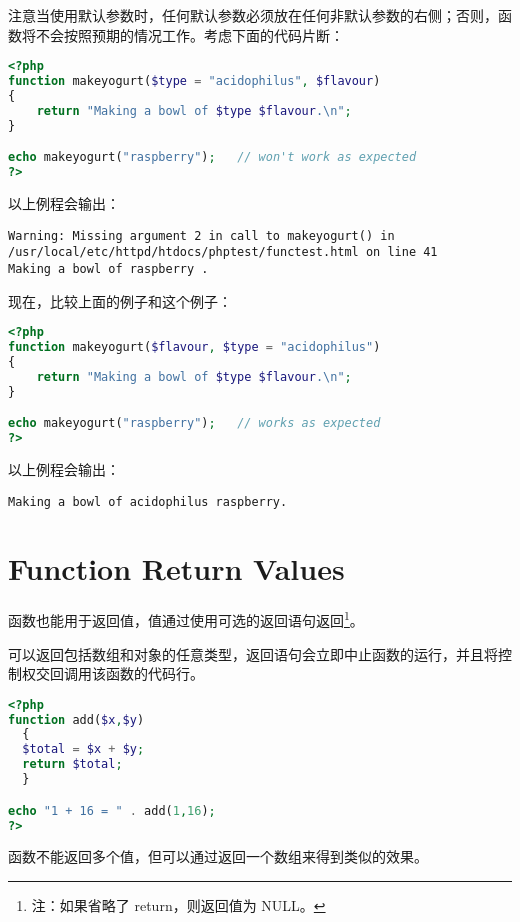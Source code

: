 注意当使用默认参数时，任何默认参数必须放在任何非默认参数的右侧；否则，函数将不会按照预期的情况工作。考虑下面的代码片断：

\begin{lstlisting}[language=PHP]
<?php
function makeyogurt($type = "acidophilus", $flavour)
{
    return "Making a bowl of $type $flavour.\n";
}

echo makeyogurt("raspberry");   // won't work as expected
?>
\end{lstlisting}

以上例程会输出：

\begin{verbatim}
Warning: Missing argument 2 in call to makeyogurt() in 
/usr/local/etc/httpd/htdocs/phptest/functest.html on line 41
Making a bowl of raspberry .
\end{verbatim}


现在，比较上面的例子和这个例子：


\begin{lstlisting}[language=PHP]
<?php
function makeyogurt($flavour, $type = "acidophilus")
{
    return "Making a bowl of $type $flavour.\n";
}

echo makeyogurt("raspberry");   // works as expected
?>
\end{lstlisting}

以上例程会输出：

\begin{verbatim}
Making a bowl of acidophilus raspberry.
\end{verbatim}



\section{Function Return Values}

函数也能用于返回值，值通过使用可选的返回语句返回\footnote{注：如果省略了 return，则返回值为 NULL。}。

可以返回包括数组和对象的任意类型，返回语句会立即中止函数的运行，并且将控制权交回调用该函数的代码行。



\begin{lstlisting}[language=PHP]
<?php
function add($x,$y)
  {
  $total = $x + $y;
  return $total;
  }

echo "1 + 16 = " . add(1,16);
?>
\end{lstlisting}


函数不能返回多个值，但可以通过返回一个数组来得到类似的效果。

